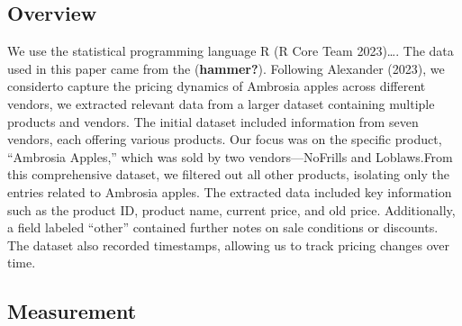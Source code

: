 \documentclass[
  letterpaper,
  DIV=11,
  numbers=noendperiod]{scrartcl}
\begin{document}
\subsection{Overview}\label{overview}

We use the statistical programming language R (R Core Team 2023)\ldots.
The data used in this paper came from the (\textbf{hammer?}). Following
Alexander (2023), we considerto capture the pricing dynamics of Ambrosia
apples across different vendors, we extracted relevant data from a
larger dataset containing multiple products and vendors. The initial
dataset included information from seven vendors, each offering various
products. Our focus was on the specific product, ``Ambrosia Apples,''
which was sold by two vendors---NoFrills and Loblaws.From this
comprehensive dataset, we filtered out all other products, isolating
only the entries related to Ambrosia apples. The extracted data included
key information such as the product ID, product name, current price, and
old price. Additionally, a field labeled ``other'' contained further
notes on sale conditions or discounts. The dataset also recorded
timestamps, allowing us to track pricing changes over time.

\subsection{Measurement}\label{measurement}
\end{document}
